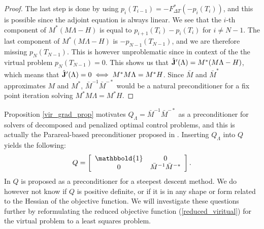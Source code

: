 \begin{proof}
The last step is done by using $p_i(T_{i-1})=-F_{\Delta T}^*(-p_i(T_i))$, and this is possible since the adjoint equation is always linear. We see that the $i$-th component of $M^* (M \Lambda-H)$ is equal to $p_{i+1}(T_i)-p_{i}(T_i)$ for $i\neq N-1$. The last component of $M^* (M \Lambda-H)$ is $-p_{N-1}(T_{N-1})$, and we are therefore missing $p_N(T_{N-1})$. This is however unproblematic since in context of the the virtual problem $p_N(T_{N-1})=0$. This shows us that $\hat{\bold J}'(\Lambda)= M^* (M \Lambda-H)$, which means that $\hat{\bold J}'(\Lambda)=0 \iff M^*M\Lambda =M^*H$. Since $\bar M$ and $\bar M^*$ approximates $M$ and $M^*$, $\bar{M}^{-1}\bar M^{-*}$ would be a natural preconditioner for a fix point iteration solving $M^*M\Lambda =M^*H$. 
\end{proof}
\noindent
Proposition \ref{vir_grad_prop} motivates $Q_{\Lambda}=\bar{M}^{-1}\bar M^{-*}$ as a preconditioner for solvers of decomposed and penalized optimal control problems, and this is actually the Parareal-based preconditioner proposed in \cite{maday2002parareal}. Inserting $Q_{\Lambda}$ into $Q$ yields the following:
\begin{align}
Q = \left[ \begin{array}{cc}
	\mathbbold{1} & 0 \\
	0 &  \bar{M}^{-1}\bar{M}^{-*}\\
	\end{array} \right]. \label{Q_PC}
\end{align}  
In \cite{maday2002parareal} $Q$ is proposed as a preconditioner for a steepest descent method. We do however not know if $Q$ is positive definite, or if it is in any shape or form related to the Hessian of the objective function. We will investigate these questions further by reformulating the reduced objective function (\ref{reduced_viritual}) for the virtual problem to a least squares problem.
